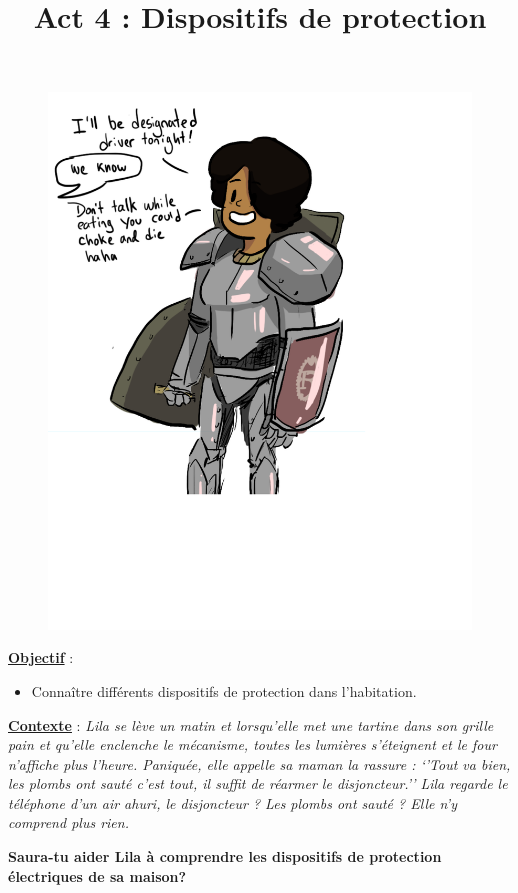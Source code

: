 \documentclass[10pt]{article}
\newcommand{\titreActivite}{Act 4 : Dispositifs de protection} %
\newcommand{\objectif}{ 	
	
	\begin{itemize}
		\item Connaître différents dispositifs de protection dans l’habitation.
	\end{itemize}
} %
\newcommand{\contexte}{
	Lila se lève un matin et lorsqu’elle met une tartine dans son grille pain et qu’elle
	enclenche le mécanisme, toutes les lumières s’éteignent et le four n’affiche plus
	l’heure. Paniquée, elle appelle sa maman la rassure : ‘’Tout va bien, les plombs ont sauté c’est tout,
	il suffit de réarmer le disjoncteur.’’ Lila regarde le téléphone d’un air ahuri, le disjoncteur ? Les
	plombs ont sauté ? Elle n’y comprend plus rien.
}
\newcommand{\resumeContexte}{
	Saura-tu aider Lila à comprendre les 
	dispositifs de protection électriques de sa maison?
	} %
\begin{document}
\date{}
\title{\titreActivite}
\maketitle %



\begin{figure}
		\vspace{-1.5cm}
		\includegraphics[width=0.5\columnwidth]{activité.png} %
		\vspace{-7cm}
		
\end{figure}


\underline{\textbf{Objectif}} :  \vspace{2pt}
\objectif

\vspace{4pt}

\underline{\textbf{Contexte}} :  \textit{\contexte}

\vspace{0.5cm}



\textbf{\resumeContexte}
\vspace{-12pt}
\end{document}
